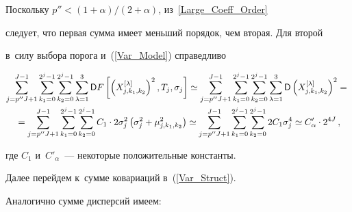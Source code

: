 Поскольку $p''<(1+\alpha)/(2+\alpha)$, из~\eqref{Large_Coeff_Order}


следует, что первая сумма имеет меньший порядок, чем вторая. Для второй


в~силу выбора порога и~(\ref{Var_Model}) справедливо


\noindent


\begin{multline*}


\sum\limits_{j = p''J + 1}^{J - 1} \sum\limits_{k_1 = 0}^{2^j - 1}


\sum\limits_{k_2 = 0}^{2^j - 1} \sum_{\lambda=1}^3 \Variance


F\left[\left(X_{j,k_1,k_2}^{[\lambda]}\right)^2,T_j,\sigma_j\right]


\simeq \sum\limits_{j = p''J + 1}^{J - 1} \sum\limits_{k_1 = 0}^{2^j - 1}


\sum\limits_{k_2 = 0}^{2^j - 1}


\sum\limits_{\lambda=1}^3 \Variance \left(X_{j,k_1,k_2}^{[\lambda]}\right)^2={}


\\


{}=


\sum_{j = p''J + 1}^{J - 1} \sum_{k_1 = 0}^{2^j - 1}


\sum_{k_2 = 0}^{2^j - 1} C_1 \cdot2\sigma_j^2\left(\sigma_j^2 +\mu^2_{j,k_1,k_2}\right)


\simeq\sum\limits_{j = p''J + 1}^{J - 1} \sum\limits_{k_1 = 0}^{2^j - 1}


\sum\limits_{k_2 = 0}^{2^j - 1} 2C_1 \sigma_j^4


\simeq C'_\alpha \cdot2^{4J}\,,


\end{multline*}


где $C_1$ и~$C'_\alpha$~--- некоторые положительные константы.


%


Далее перейдем к~сумме ковариаций в~(\ref{Var_Struct}).


Аналогично сумме дисперсий имеем:



